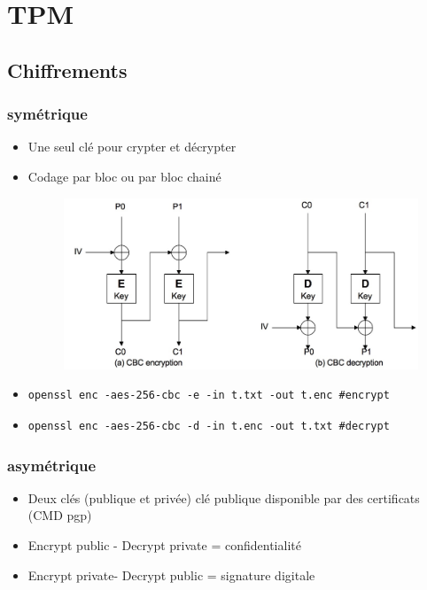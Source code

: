 \documentclass[resume]{subfiles}
\begin{document}
\section{TPM}

\subsection{Chiffrements}

\subsubsection{symétrique}

\begin{itemize}
\item Une seul clé pour crypter et décrypter
\item Codage par bloc ou par bloc chainé \begin{figure}[H]
    \centering
    \includegraphics[width=0.75\columnwidth]{Figures/TPM/CBC.png}
\end{figure}

\item \begin{lstlisting}[style=bash]
openssl enc -aes-256-cbc -e -in t.txt -out t.enc #encrypt
\end{lstlisting}
\item \begin{lstlisting}[style=bash]
openssl enc -aes-256-cbc -d -in t.enc -out t.txt #decrypt
\end{lstlisting}
\end{itemize}

\subsubsection{asymétrique}
\begin{itemize}
\item Deux clés (publique et privée) clé publique disponible par des certificats (CMD pgp)
\item Encrypt public - Decrypt private = confidentialité
\item Encrypt private- Decrypt public = signature digitale
\end{itemize}
\end{document}
